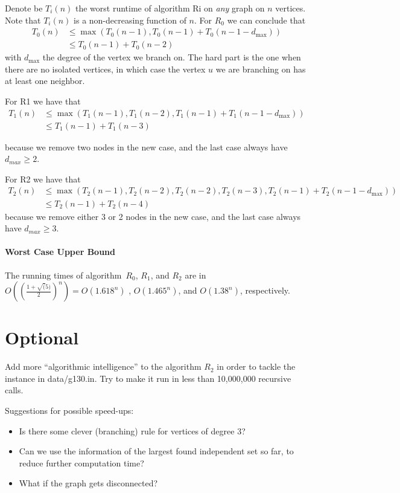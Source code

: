 \documentclass{tufte-handout}
\begin{document}
Denote be $T_i(n)$ the worst runtime of algorithm Ri on \emph{any} graph on $n$ vertices.
Note that $T_i(n)$ is a non-decreasing function of $n$.
For $R_0$ we can conclude that
\begin{align*}
T_0(n) &\leq\max(T_0(n-1), T_0(n-1)+T_0(n-1-d_{\mbox{max}})) \\ &\leq T_0(n-1)+T_0(n-2)
\end{align*}
with $d_{\mbox{max}}$ the degree of the vertex we branch on. The hard part is the one when there are no isolated vertices, in which case the vertex $u$ we are branching on has at least one neighbor. 

For R1 we have that
\begin{align*}
	T_1(n) &\leq\max(T_1(n-1), T_1(n-2), T_1(n-1)+T_1(n-1-d_{\mbox{max}})) \\ &\leq T_1(n-1)+T_1(n-3)
\end{align*}

because we remove two nodes in the new case, and the last case always have $d_{max} \geq 2$.

For R2 we have that
\begin{align*}
	T_2(n) &\leq\max(T_2(n-1), T_2(n-2), T_2(n-2), T_2(n-3), T_2(n-1)+T_2(n-1-d_{\mbox{max}})) \\ &\leq T_2(n-1)+T_2(n-4)
\end{align*}
because we remove either 3 or 2  nodes in the new case, and the last case always have $d_{max} \geq 3$.


\paragraph{Worst Case Upper Bound}
The running times of algorithm~$R_0$, $R_1$, and $R_2$ are in
$O((\frac{1+\sqrt(5)}{2})^n)=O(1.618^n)$ , $O(1.465^n)$, and $O(1.38^n)$, respectively. \newpage

\section{Optional}
Add more ``algorithmic intelligence'' to the algorithm $R_2$ in order to tackle the instance in data/g130.in.
Try to make it run in less than 10,000,000 recursive calls. 

Suggestions for possible speed-ups:
\begin{itemize}
\item Is there some clever (branching) rule for vertices of degree 3?
\item Can we use the information of the largest found independent set so far, to reduce further computation time?
\item What if the graph gets disconnected?
\end{itemize}
\end{document}
